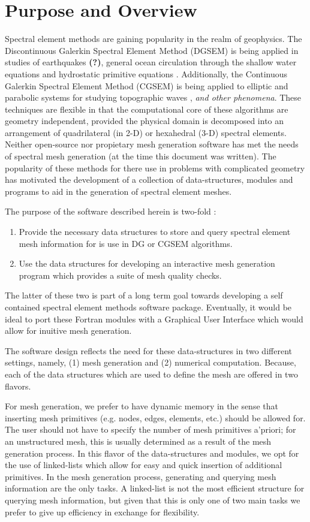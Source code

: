 \documentclass[12pt]{softwaremanual}
\begin{document}
\chapter{Purpose and Overview}
Spectral element methods are gaining popularity in the realm of geophysics. The Discontinuous Galerkin Spectral Element Method (DGSEM) is being applied in studies of earthquakes \textbf{(?)}, general ocean circulation through the shallow water equations \citep{Iskandarani1993} and hydrostatic primitive equations \citep{Iskandarani2000}. Additionally, the Continuous Galerkin Spectral Element Method (CGSEM) is being applied to elliptic and parabolic systems for studying topographic waves \citep{Schoonover2016}, \textit{and other phenomena}. These techniques are flexible in that the computational core of these algorithms are geometry independent, provided the physical domain is decomposed into an arrangement of quadrilateral (in 2-D) or hexahedral (3-D) spectral elements. Neither open-source nor propietary mesh generation software has met the needs of spectral mesh generation (at the time this document was written). The popularity of these methods for there use in problems with complicated geometry has motivated the development of a collection of data-structures, modules and programs to aid in the generation of spectral element meshes.

The purpose of the software described herein is two-fold : 
\begin{enumerate}
\item Provide the necessary data structures to store and query spectral element mesh information for is use in DG or CGSEM algorithms.
\item Use the data structures for developing an interactive mesh generation program which provides a suite of mesh quality checks.
\end{enumerate}
The latter of these two is part of a long term goal towards developing a self contained spectral element methods software package. Eventually, it would be ideal to port these Fortran modules with a Graphical User Interface which would allow for inuitive mesh generation.

The software design reflects the need for these data-structures in two different settings, namely, (1) mesh generation and (2) numerical computation. Because, each of the data structures which are used to define the mesh are offered in two flavors. 

For mesh generation, we prefer to have dynamic memory in the sense that inserting mesh primitives (e.g. nodes, edges, elements, etc.) should be allowed for. The user should not have to specify the number of mesh primitives a'priori; for an unstructured mesh, this is usually determined as a result of the mesh generation process. In this flavor of the data-structures and modules, we opt for the use of linked-lists which allow for easy and quick insertion of additional primitives. In the mesh generation process, generating and querying mesh information are the only tasks. A linked-list is not the most efficient structure for querying mesh information, but given that this is only one of two main tasks we prefer to give up efficiency in exchange for flexibility.
\end{document}
